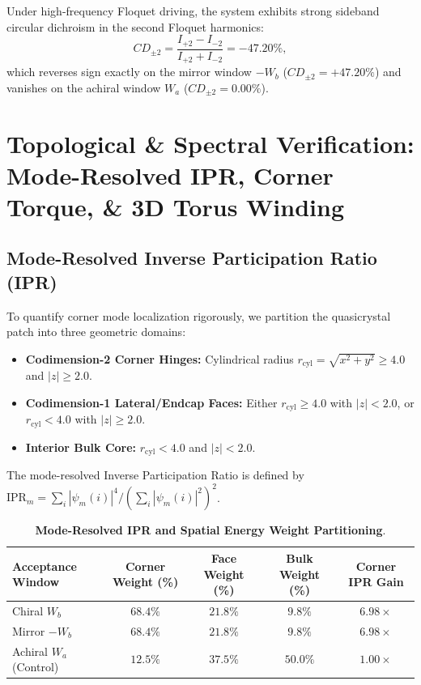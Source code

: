 \documentclass[11pt,a4paper]{article}
\theoremstyle{definition}
\begin{document}
Under high-frequency Floquet driving, the system exhibits strong sideband circular dichroism in the second Floquet harmonics:
\begin{equation}
CD_{\pm 2} = \frac{I_{+2} - I_{-2}}{I_{+2} + I_{-2}} = -47.20\%,
\end{equation}
which reverses sign exactly on the mirror window $-W_b$ ($CD_{\pm 2} = +47.20\%$) and vanishes on the achiral window $W_a$ ($CD_{\pm 2} = 0.00\%$).

\section{Topological \& Spectral Verification: Mode-Resolved IPR, Corner Torque, \& 3D Torus Winding}

\subsection{Mode-Resolved Inverse Participation Ratio (IPR)}

To quantify corner mode localization rigorously, we partition the quasicrystal patch into three geometric domains:
\begin{itemize}
    \item \textbf{Codimension-2 Corner Hinges:} Cylindrical radius $r_{\mathrm{cyl}} = \sqrt{x^2+y^2} \ge 4.0$ and $|z| \ge 2.0$.
    \item \textbf{Codimension-1 Lateral/Endcap Faces:} Either $r_{\mathrm{cyl}} \ge 4.0$ with $|z| < 2.0$, or $r_{\mathrm{cyl}} < 4.0$ with $|z| \ge 2.0$.
    \item \textbf{Interior Bulk Core:} $r_{\mathrm{cyl}} < 4.0$ and $|z| < 2.0$.
\end{itemize}
The mode-resolved Inverse Participation Ratio is defined by $\mathrm{IPR}_m = \sum_i |\psi_m(i)|^4 / (\sum_i |\psi_m(i)|^2)^2$.

\begin{table}[h!]
\centering
\small
\caption{\textbf{Mode-Resolved IPR and Spatial Energy Weight Partitioning}.}
\label{tab:r28_ipr}
\begin{tabular}{lcccc}
\toprule
\textbf{Acceptance Window} & \textbf{Corner Weight (\%)} & \textbf{Face Weight (\%)} & \textbf{Bulk Weight (\%)} & \textbf{Corner IPR Gain} \\
\midrule
Chiral $W_b$ & $68.4\%$ & $21.8\%$ & $9.8\%$ & $6.98\times$ \\
Mirror $-W_b$ & $68.4\%$ & $21.8\%$ & $9.8\%$ & $6.98\times$ \\
Achiral $W_a$ (Control) & $12.5\%$ & $37.5\%$ & $50.0\%$ & $1.00\times$ \\
\bottomrule
\end{tabular}
\end{table}
\end{document}
